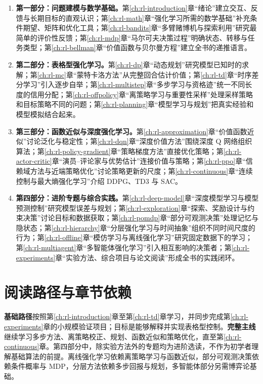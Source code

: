 \documentclass[UTF8,12pt,a4paper,fontset=fandol]{ctexbook}
\begin{document}
\begin{enumerate}
  \item \textbf{第一部分：问题建模与数学基础。}第\ref{ch:rl-introduction}章“绪论”建立交互、反馈与长期目标的直观认识；第\ref{ch:rl-math}章“强化学习所需的数学基础”补充条件期望、矩阵和优化工具；第\ref{ch:rl-bandits}章“多臂赌博机与探索利用”研究最简单的评价性反馈；第\ref{ch:rl-mdp}章“马尔可夫决策过程”明确状态、转移与任务类型；第\ref{ch:rl-bellman}章“价值函数与贝尔曼方程”建立全书的递推语言。
  \item \textbf{第二部分：表格型强化学习。}第\ref{ch:rl-dp}章“动态规划”研究模型已知时的求解；第\ref{ch:rl-mc}章“蒙特卡洛方法”从完整回合估计价值；第\ref{ch:rl-td}章“时序差分学习”引入逐步自举；第\ref{ch:rl-multistep}章“多步学习与资格迹”统一不同长度的信用分配；第\ref{ch:rl-offpolicy}章“离策略学习与重要性采样”处理采样策略和目标策略不同的问题；第\ref{ch:rl-planning}章“模型学习与规划”把真实经验和模型模拟结合起来。
  \item \textbf{第三部分：函数近似与深度强化学习。}第\ref{ch:rl-approximation}章“价值函数近似”讨论泛化与稳定性；第\ref{ch:rl-dqn}章“深度价值方法”围绕深度 Q 网络组织算法；第\ref{ch:rl-policy-gradient}章“策略梯度方法”直接优化策略；第\ref{ch:rl-actor-critic}章“演员--评论家与优势估计”连接价值与策略；第\ref{ch:rl-ppo}章“信赖域方法与近端策略优化”讨论策略更新的尺度；第\ref{ch:rl-continuous}章“连续控制与最大熵强化学习”介绍 DDPG、TD3 与 SAC。
  \item \textbf{第四部分：进阶专题与综合实践。}第\ref{ch:rl-deep-model}章“深度模型学习与模型预测控制”研究模型误差与规划；第\ref{ch:rl-exploration}章“探索、奖励设计与约束决策”讨论目标和数据获取；第\ref{ch:rl-pomdp}章“部分可观测决策”处理记忆与隐状态；第\ref{ch:rl-hierarchy}章“分层强化学习与时间抽象”组织不同时间尺度的行为；第\ref{ch:rl-offline}章“模仿学习与离线强化学习”研究固定数据下的学习；第\ref{ch:rl-multiagent}章“多智能体强化学习”引入相互影响的决策者；第\ref{ch:rl-experiments}章“实验方法、综合项目与论文阅读”形成全书的实践闭环。
\end{enumerate}

\section*{阅读路径与章节依赖}

\textbf{基础路径}按照第\ref{ch:rl-introduction}章至第\ref{ch:rl-td}章学习，并同步完成第\ref{ch:rl-experiments}章的小规模验证项目；目标是能够解释并实现表格型控制。\textbf{完整主线}继续学习多步方法、离策略校正、规划、函数近似和策略优化，直至第\ref{ch:rl-continuous}章。第四部分中，除实验方法外的专题均为进阶选读，不作为初学者理解基础算法的前提。离线强化学习依赖离策略学习与函数近似，部分可观测决策依赖条件概率与 MDP，分层方法依赖多步回报与规划，多智能体部分另需博弈论基础。
\end{document}
